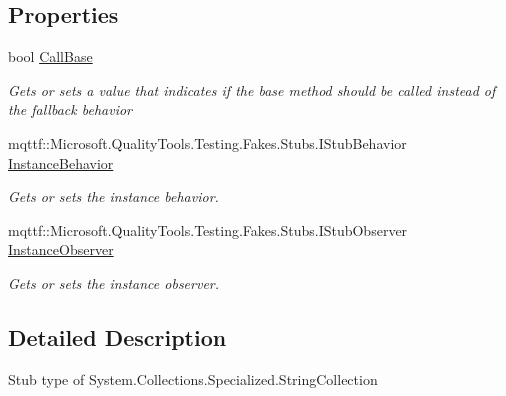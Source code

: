 \subsection*{Properties}
\begin{DoxyCompactItemize}
\item 
bool \hyperlink{class_system_1_1_collections_1_1_specialized_1_1_fakes_1_1_stub_string_collection_a3fec5249e74527ab44d2f121426ebe03}{Call\-Base}
\begin{DoxyCompactList}\small\item\em Gets or sets a value that indicates if the base method should be called instead of the fallback behavior\end{DoxyCompactList}\item 
mqttf\-::\-Microsoft.\-Quality\-Tools.\-Testing.\-Fakes.\-Stubs.\-I\-Stub\-Behavior \hyperlink{class_system_1_1_collections_1_1_specialized_1_1_fakes_1_1_stub_string_collection_a53693d415c52c2dac9a27048a05f3b78}{Instance\-Behavior}
\begin{DoxyCompactList}\small\item\em Gets or sets the instance behavior.\end{DoxyCompactList}\item 
mqttf\-::\-Microsoft.\-Quality\-Tools.\-Testing.\-Fakes.\-Stubs.\-I\-Stub\-Observer \hyperlink{class_system_1_1_collections_1_1_specialized_1_1_fakes_1_1_stub_string_collection_a62be5ad7a094495dc623c986e4231302}{Instance\-Observer}
\begin{DoxyCompactList}\small\item\em Gets or sets the instance observer.\end{DoxyCompactList}\end{DoxyCompactItemize}


\subsection{Detailed Description}
Stub type of System.\-Collections.\-Specialized.\-String\-Collection



